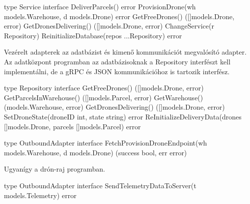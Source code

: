 \begin{python}
    type Service interface {
        DeliverParcels() error
        ProvisionDrone(wh models.Warehouse, d models.Drone) error
        GetFreeDrones() ([]models.Drone, error)
        GetDronesDelivering() ([]models.Drone, error)
        ChangeService(r Repository)
        ReinitializeDatabase(repos ...Repository) error
    }
\end{python}
Vezérelt adapterek az adatbázist és kimenő kommunikációt megvalósító adapter.
Az adatközpont programban az adatbázisoknak a Repository interfészt kell implementálni, de a gRPC és JSON kommunikációhoz is tartozik interfész.
\begin{python}
    type Repository interface {
        GetFreeDrones() ([]models.Drone, error)
        GetParcelsInWarehouse() ([]models.Parcel, error)
        GetWarehouse() (models.Warehouse, error)
        GetDronesDelivering() ([]models.Drone, error)
        SetDroneState(droneID int, state string) error
        ReInitializeDeliveryData(drones []models.Drone, parcels []models.Parcel) error
    }

    type OutboundAdapter interface {
        FetchProvisionDroneEndpoint(wh models.Warehouse, d models.Drone) (success bool, err error)
    }
\end{python}

Ugyanígy a drón-raj programban.
\begin{python}
    type OutboundAdapter interface {
        SendTelemetryDataToServer(t models.Telemetry) error
    }
\end{python}
